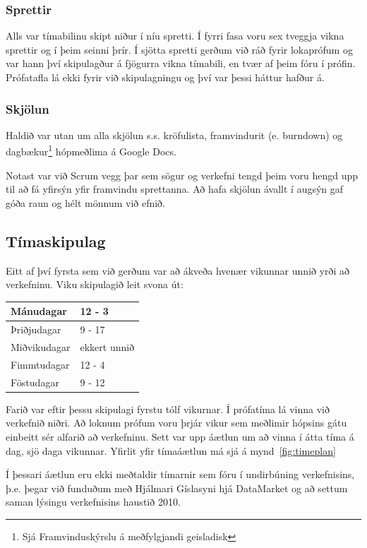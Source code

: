 \documentclass{article}
\begin{document}
\subsubsection{Sprettir}
Alls var tímabilinu skipt niður í níu spretti. Í fyrri fasa voru sex 
tveggja vikna sprettir og í þeim seinni þrír. Í sjötta spretti gerðum við ráð fyrir lokaprófum og var hann því
skipulagður á fjögurra vikna tímabili, 
en tvær af þeim fóru í prófin. Prófatafla lá ekki fyrir við skipulagningu og því 
var þessi háttur hafður á. 


\subsubsection{Skjölun}

Haldið var utan um alla skjölun s.s. kröfulista, framvindurit (e. burndown) og dagbækur\footnote{Sjá Framvinduskýrslu á meðfylgjandi geisladisk}
 hópmeðlima á Google Docs. 

Notast var við Scrum vegg þar sem sögur og verkefni tengd þeim voru hengd upp til að fá yfirsýn 
yfir framvindu sprettanna. Að hafa skjölun ávallt í augsýn gaf góða raun og hélt mönnum við efnið.

\subsection{Tímaskipulag}
Eitt af því fyrsta sem við gerðum var að ákveða hvenær 
vikunnar unnið yrði að verkefninu.
Viku skipulagið leit svona út:

\vspace{5 mm}
\begin{tabular}{| l | l |}
\hline
  Mánudagar & 12 - 3 \\
  \hline
  Þriðjudagar & 9 - 17 \\
  \hline
  Miðvikudagar & ekkert unnið\\
  \hline
  Fimmtudagar & 12 - 4 \\
  \hline
  Föstudagar & 9 - 12\\
\hline
\end{tabular}
\vspace{5 mm}

Farið var eftir þessu skipulagi fyrstu tólf vikurnar. 
Í prófatíma lá vinna við verkefnið niðri. 
Að loknum prófum voru þrjár vikur sem meðlimir hópsins gátu einbeitt sér alfarið
að verkefninu. Sett var upp áætlun um að vinna í átta tíma á dag, sjö daga
vikunnar. Yfirlit yfir tímaáætlun má sjá á mynd~\ref{fig:timeplan}

Í þessari áætlun eru ekki meðtaldir tímarnir sem fóru í undirbúning verkefnisins, þ.e.
þegar við funduðum með Hjálmari Gíslasyni hjá DataMarket og að settum saman
lýsingu verkefnisins haustið 2010.
\end{document}
